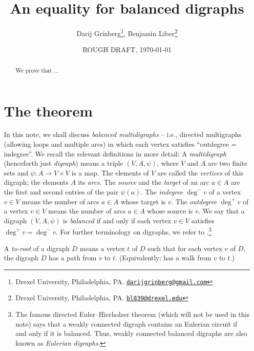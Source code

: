 \documentclass[numbers=enddot,12pt,final,onecolumn,notitlepage]{scrartcl}%
\theoremstyle{definition}
\theoremstyle{plainsl}
\begin{document}
\title{An equality for balanced digraphs}
\author{Darij Grinberg\thanks{Drexel University, Philadelphia, PA.
\href{mailto:darijgrinberg@gmail.com}{\texttt{darijgrinberg@gmail.com}}},
Benjamin Liber\thanks{Drexel University, Philadelphia, PA.
\href{mailto:TODO_add_email@gmail.com}{\texttt{bl839@drexel.edu}}}}
\date{ROUGH DRAFT, \today}
\maketitle

\begin{abstract}
We prove that ...

\end{abstract}

\section{The theorem}

In this note, we shall discuss \emph{balanced multidigraphs} -- i.e., directed
multigraphs (allowing loops and multiple arcs) in which each vertex satisfies
\textquotedblleft outdegree = indegree\textquotedblright. We recall the
relevant definitions in more detail: A \emph{multidigraph} (henceforth just
\emph{digraph}) means a triple $\left(  V,A,\psi\right)  $, where $V$ and $A$
are two finite sets and $\psi:A\rightarrow V\times V$ is a map. The elements
of $V$ are called the \emph{vertices} of this digraph; the elements $A$ its
\emph{arcs}. The \emph{source} and the \emph{target} of an arc $a\in A$ are
the first and second entries of the pair $\psi\left(  a\right)  $. The
\emph{indegree} $\deg^{-}v$ of a vertex $v\in V$ means the number of arcs
$a\in A$ whose target is $v$. The \emph{outdegree} $\deg^{+}v$ of a vertex
$v\in V$ means the number of arcs $a\in A$ whose source is $v$. We say that a
digraph $\left(  V,A,\psi\right)  $ is \emph{balanced} if and only if each
vertex $v\in V$ satisfies $\deg^{+}v=\deg^{-}v$. For further terminology on
digraphs, we refer to \cite{22s}.\footnote{The famous directed
Euler--Hierholzer theorem (which will not be used in this note) says that a
weakly connected digraph contains an Eulerian circuit if and only if it is
balanced. Thus, weakly connected balanced digraphs are also known as
\emph{Eulerian digraphs}.}

A \emph{to-root} of a digraph $D$ means a vertex $t$ of $D$ such that for each
vertex $v$ of $D$, the digraph $D$ has a path from $v$ to $t$. (Equivalently:
has a walk from $v$ to $t$.)
\end{document}
